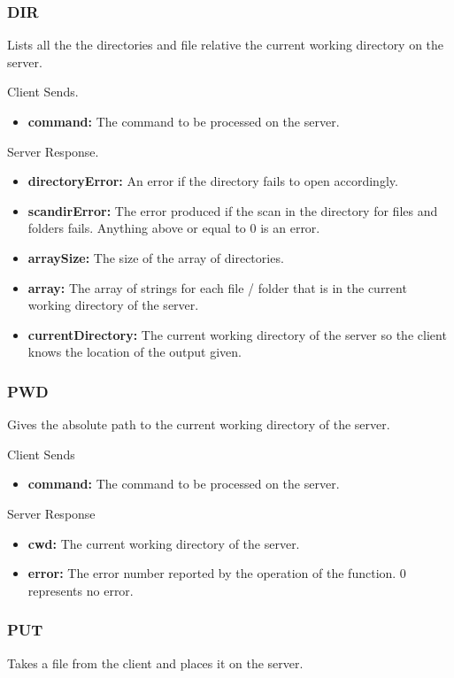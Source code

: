 \documentclass{article}
\begin{document}
\subsubsection{DIR}
Lists all the the directories and file relative the current working directory on the server.

Client Sends.
\begin{itemize}
\item \textbf{command:} The command to be processed on the server.
\end{itemize}

Server Response.
\begin{itemize}
\item \textbf{directoryError:} An error if the directory fails to open accordingly.
\item \textbf{scandirError:} The error produced if the scan in the directory for files and folders fails. Anything above or equal to 0 is an error.
\item \textbf{arraySize:} The size of the array of directories.
\item \textbf{array:} The array of strings for each file / folder that is in the current working directory of the server.
\item \textbf{currentDirectory:} The current working directory of the server so the client knows the location of the output given.
\end{itemize}

\subsubsection{PWD}
Gives the absolute path to the current working directory of the server.

Client Sends
\begin{itemize}
\item \textbf{command:} The command to be processed on the server.
\end{itemize}

Server Response
\begin{itemize}
\item \textbf{cwd:} The current working directory of the server.
\item \textbf{error:} The error number reported by the operation of the function. 0 represents no error.
\end{itemize}

\subsubsection{PUT}
Takes a file from the client and places it on the server.
\end{document}
